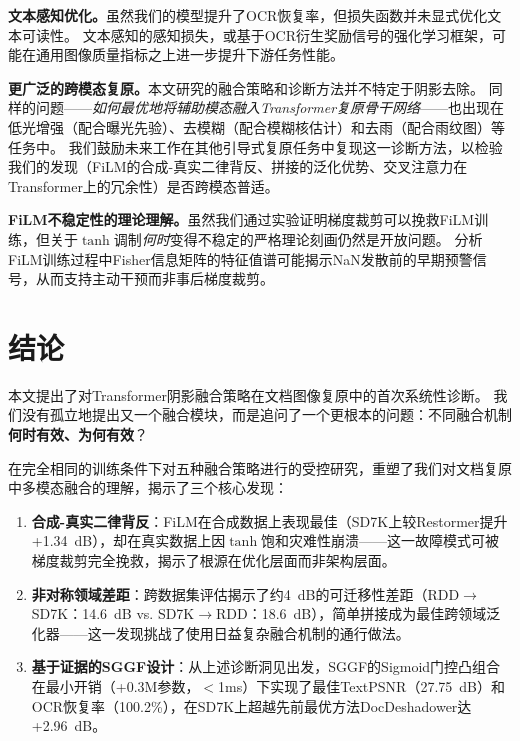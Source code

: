 \documentclass[11pt]{ctexart}
\begin{document}
\textbf{文本感知优化。}虽然我们的模型提升了OCR恢复率，但损失函数并未显式优化文本可读性。
文本感知的感知损失，或基于OCR衍生奖励信号的强化学习框架，可能在通用图像质量指标之上进一步提升下游任务性能。

\textbf{更广泛的跨模态复原。}本文研究的融合策略和诊断方法并不特定于阴影去除。
同样的问题——\textit{如何最优地将辅助模态融入Transformer复原骨干网络}——也出现在低光增强（配合曝光先验）、去模糊（配合模糊核估计）和去雨（配合雨纹图）等任务中。
我们鼓励未来工作在其他引导式复原任务中复现这一诊断方法，以检验我们的发现（FiLM的合成-真实二律背反、拼接的泛化优势、交叉注意力在Transformer上的冗余性）是否跨模态普适。

\textbf{FiLM不稳定性的理论理解。}虽然我们通过实验证明梯度裁剪可以挽救FiLM训练，但关于$\tanh$调制\textit{何时}变得不稳定的严格理论刻画仍然是开放问题。
分析FiLM训练过程中Fisher信息矩阵的特征值谱可能揭示NaN发散前的早期预警信号，从而支持主动干预而非事后梯度裁剪。

\section{结论}

本文提出了对Transformer阴影融合策略在文档图像复原中的首次系统性诊断。
我们没有孤立地提出又一个融合模块，而是追问了一个更根本的问题：不同融合机制\textbf{何时有效、为何有效}？

在完全相同的训练条件下对五种融合策略进行的受控研究，重塑了我们对文档复原中多模态融合的理解，揭示了三个核心发现：

\begin{enumerate}
  \item \textbf{合成-真实二律背反}：FiLM在合成数据上表现最佳（SD7K上较Restormer提升+1.34~dB），却在真实数据上因$\tanh$饱和灾难性崩溃——这一故障模式可被梯度裁剪完全挽救，揭示了根源在优化层面而非架构层面。
  \item \textbf{非对称领域差距}：跨数据集评估揭示了约4~dB的可迁移性差距（RDD$\rightarrow$SD7K：14.6~dB vs. SD7K$\rightarrow$RDD：18.6~dB），简单拼接成为最佳跨领域泛化器——这一发现挑战了使用日益复杂融合机制的通行做法。
  \item \textbf{基于证据的SGGF设计}：从上述诊断洞见出发，SGGF的Sigmoid门控凸组合在最小开销（+0.3M参数，$<$1ms）下实现了最佳TextPSNR（27.75~dB）和OCR恢复率（100.2\%），在SD7K上超越先前最优方法DocDeshadower达+2.96~dB。
\end{enumerate}
\end{document}
